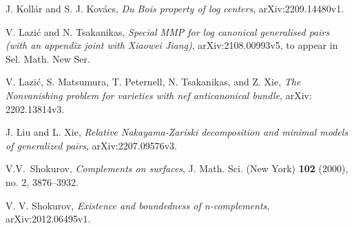 \documentclass[11pt]{amsart}
\numberwithin{equation}{section}
\theoremstyle{definition}
\theoremstyle{definition}
\theoremstyle{definition}
\begin{document}
\begin{thebibliography}{ABCDE}
       J. Koll\'ar and S. J. Kov\'acs, \textit{Du
      Bois property of log centers}, arXiv:2209.14480v1.

       V. Lazi\'c and N. Tsakanikas,
      \textit{Special MMP for log canonical generalised pairs (with
      an appendix joint with Xiaowei Jiang)}, arXiv:2108.00993v5, to
      appear in Sel. Math. New Ser.

       V. Lazi\'c, S. Matsumura, T.
      Peternell, N. Tsakanikas, and Z. Xie, \textit{The Nonvanishing
      problem for varieties with nef anticanonical bundle}, arXiv: 2202.13814v3.

       J. Liu and L. Xie, \textit{Relative
        Nakayama-Zariski decomposition and minimal models of
      generalized pairs}, arXiv:2207.09576v3.

       V.V.~Shokurov, \textit{Complements on
      surfaces}, J. Math. Sci. (New York) \textbf{102} (2000), no. 2,
      3876--3932.

       V. V. Shokurov, \textit{Existence and
      boundedness of n-complements}, arXiv:2012.06495v1.
    \end{thebibliography}
    
\end{document}
